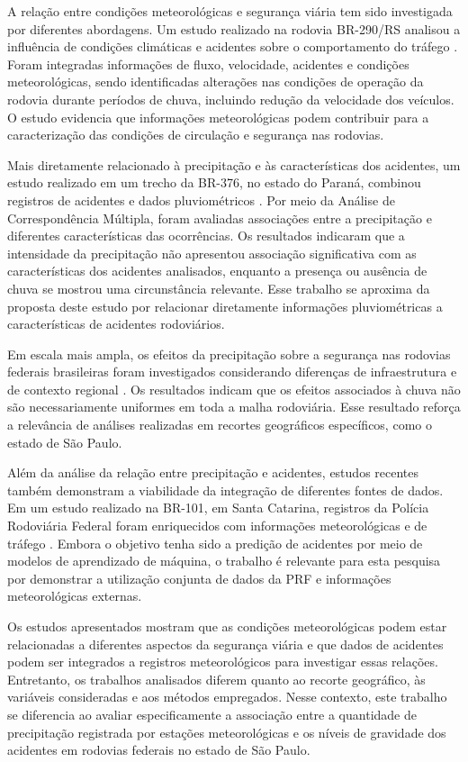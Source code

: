 \documentclass[12pt]{article}
\begin{document}
A relação entre condições meteorológicas e segurança viária tem sido investigada
por diferentes abordagens. Um estudo realizado na rodovia BR-290/RS analisou a
influência de condições climáticas e acidentes sobre o comportamento do tráfego
\cite{caleffi2016}. Foram integradas informações de fluxo, velocidade, acidentes
e condições meteorológicas, sendo identificadas alterações nas condições de
operação da rodovia durante períodos de chuva, incluindo redução da velocidade
dos veículos. O estudo evidencia que informações meteorológicas podem contribuir
para a caracterização das condições de circulação e segurança nas rodovias.

Mais diretamente relacionado à precipitação e às características dos acidentes,
um estudo realizado em um trecho da BR-376, no estado do Paraná, combinou
registros de acidentes e dados pluviométricos \cite{silva2020}. Por meio da
Análise de Correspondência Múltipla, foram avaliadas associações entre a
precipitação e diferentes características das ocorrências. Os resultados
indicaram que a intensidade da precipitação não apresentou associação
significativa com as características dos acidentes analisados, enquanto a
presença ou ausência de chuva se mostrou uma circunstância relevante. Esse
trabalho se aproxima da proposta deste estudo por relacionar diretamente
informações pluviométricas a características de acidentes rodoviários.

Em escala mais ampla, os efeitos da precipitação sobre a segurança nas rodovias
federais brasileiras foram investigados considerando diferenças de infraestrutura
e de contexto regional \cite{brasileiro2026}. Os resultados indicam que os efeitos
associados à chuva não são necessariamente uniformes em toda a malha rodoviária.
Esse resultado reforça a relevância de análises realizadas em recortes geográficos
específicos, como o estado de São Paulo.

Além da análise da relação entre precipitação e acidentes, estudos recentes
também demonstram a viabilidade da integração de diferentes fontes de dados.
Em um estudo realizado na BR-101, em Santa Catarina, registros da Polícia
Rodoviária Federal foram enriquecidos com informações meteorológicas e de
tráfego \cite{fuhr2026}. Embora o objetivo tenha sido a predição de acidentes
por meio de modelos de aprendizado de máquina, o trabalho é relevante para esta
pesquisa por demonstrar a utilização conjunta de dados da PRF e informações
meteorológicas externas.

Os estudos apresentados mostram que as condições meteorológicas podem estar
relacionadas a diferentes aspectos da segurança viária e que dados de acidentes
podem ser integrados a registros meteorológicos para investigar essas relações.
Entretanto, os trabalhos analisados diferem quanto ao recorte geográfico, às
variáveis consideradas e aos métodos empregados. Nesse contexto, este trabalho
se diferencia ao avaliar especificamente a associação entre a quantidade de
precipitação registrada por estações meteorológicas e os níveis de gravidade
dos acidentes em rodovias federais no estado de São Paulo.
\end{document}
